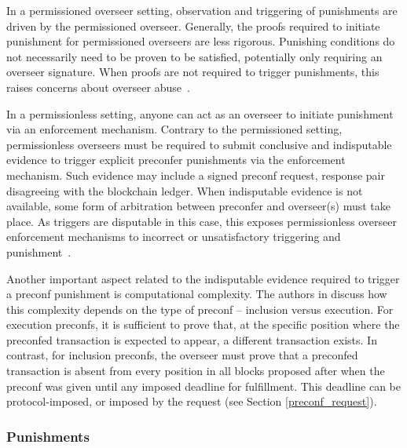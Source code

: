 \documentclass[a4paper]{article}
\theoremstyle{boldstyle}
\begin{document}
    In a permissioned overseer setting, observation and triggering of punishments are driven by the permissioned overseer. Generally, the proofs required to initiate punishment for permissioned overseers are less rigorous.  Punishing conditions do not necessarily need to be proven to be satisfied, potentially only requiring an overseer signature. When proofs are not required to trigger punishments, this raises concerns about overseer abuse~\cite{W:PreconfirmationFairExchange}.

    In a permissionless setting, anyone can act as an overseer to initiate punishment via an enforcement mechanism. Contrary to the permissioned setting, permissionless overseers must be required to submit conclusive and indisputable evidence to trigger explicit preconfer punishments via the enforcement mechanism. Such evidence may include a signed preconf request, response pair disagreeing with the blockchain ledger. When indisputable evidence is not available, some form of arbitration between preconfer and overseer(s) must take place. As triggers are disputable in this case, this exposes permissionless overseer enforcement mechanisms to incorrect or unsatisfactory triggering and punishment~\cite{W:GitHub-UniversalRegistryContract,W:GitHub-ExampleSlasherImplementations,W:PreconfirmationFairExchange}. 
    
    Another important aspect related to the indisputable evidence required to trigger a preconf punishment is computational complexity. The authors in \cite{W:ATaxonomyofPreconfirmationGuaranteesandTheirSlashingConditionsinRollups} discuss how this complexity depends on the type of preconf -- inclusion versus execution. For execution preconfs, it is sufficient to prove that, at the specific position where the preconfed transaction is expected to appear, a different transaction exists. In contrast, for inclusion preconfs, the overseer must prove that a preconfed transaction is absent from every position in all blocks proposed after when the preconf was given until any imposed deadline for fulfillment. This deadline can be protocol-imposed, or imposed by the request (see Section \ref{preconf_request}).

    \subsubsection{Punishments} \label{punishments}
\end{document}
